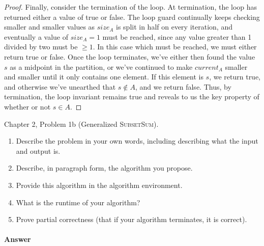 \documentclass{article}
\begin{document}
\begin{enumerate}
\begin{proof}
			Finally, consider the termination of the loop. At termination, the loop has returned either
			a value of true or false. The loop guard continually keeps checking smaller and smaller values as $size_A$ is split in half
			on every iteration, and eventually a value of $size_A=1$ must be reached, since any value greater than 1 divided by two must 
			be $\geq 1$. In this case which must be reached, we must either return true or false. Once the loop terminates, we've either 
			then found the value $s$ as a midpoint in the partition, or we've
			continued to make $current_A$ smaller and smaller until it only contains one element. If this element is $s$, we return true, and
			otherwise we've unearthed that $s \not \in A$, and we return false. Thus, by termination, the loop invariant remains true and
			reveals to us the key property of whether or not $s \in A$.
		\end{proof}


\end{enumerate}



\nextprob
{}

Chapter 2, Problem 1b (Generalized \textsc{SubsetSum}).
\begin{enumerate}
    \item Describe the problem in your own words, including
        describing what the input and output is.
    \item Describe, in paragraph form, the algorithm you propose.
    \item Provide this algorithm in the algorithm environment.
    \item What is the runtime of your algorithm?
    \item Prove partial correctness (that if your algorithm terminates, it is
        correct).
\end{enumerate}



\paragraph{Answer}

\end{document}
